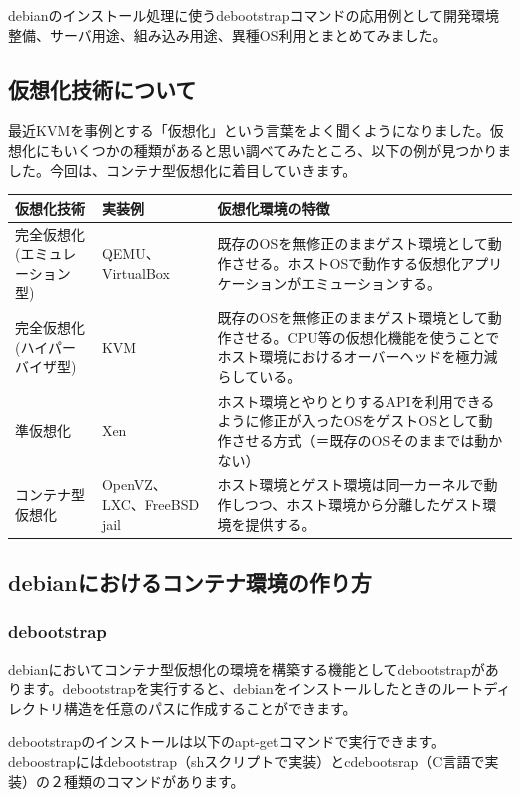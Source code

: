 \documentclass[mingoth,a4paper]{jsarticle}
\begin{document}
debianのインストール処理に使うdebootstrapコマンドの応用例として開発環境整備、サーバ用途、組み込み用途、異種OS利用とまとめてみました。

\subsection{仮想化技術について}
最近KVMを事例とする「仮想化」という言葉をよく聞くようになりました。仮想化にもいくつかの種類があると思い調べてみたところ、以下の例が見つかりました。今回は、コンテナ型仮想化に着目していきます。

\begin{table}[hb]
  \begin{tabular}{|l|p{10em}|p{20em}|} \hline
    仮想化技術 & 実装例 & 仮想化環境の特徴 \\ \hline
    完全仮想化(エミュレーション型) & QEMU、VirtualBox & 既存のOSを無修正のままゲスト環境として動作させる。ホストOSで動作する仮想化アプリケーションがエミューションする。 \\ \hline
    完全仮想化(ハイパーバイザ型) & KVM & 既存のOSを無修正のままゲスト環境として動作させる。CPU等の仮想化機能を使うことでホスト環境におけるオーバーヘッドを極力減らしている。 \\ \hline
    準仮想化 & Xen & ホスト環境とやりとりするAPIを利用できるように修正が入ったOSをゲストOSとして動作させる方式（＝既存のOSそのままでは動かない） \\ \hline
    コンテナ型仮想化 & OpenVZ、LXC、FreeBSD jail & ホスト環境とゲスト環境は同一カーネルで動作しつつ、ホスト環境から分離したゲスト環境を提供する。  \\ \hline
  \end{tabular}
\end{table}

\subsection{debianにおけるコンテナ環境の作り方}

\subsubsection{debootstrap}
debianにおいてコンテナ型仮想化の環境を構築する機能としてdebootstrapがあります。debootstrapを実行すると、debianをインストールしたときのルートディレクトリ構造を任意のパスに作成することができます。

debootstrapのインストールは以下のapt-getコマンドで実行できます。deboostrapにはdebootstrap（shスクリプトで実装）とcdebootsrap（C言語で実装）の２種類のコマンドがあります。
\end{document}
